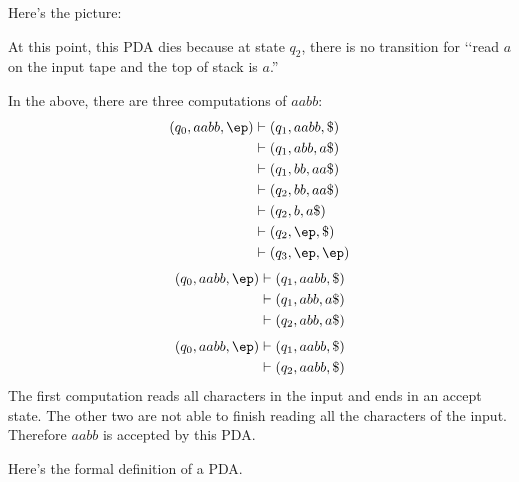 Here's the picture:



At this point, this PDA dies because at state $q_2$, there is no
transition for \lq\lq read $a$ on the input tape and the top of stack is $a$.''

In the above, there are three computations of $aabb$:
\begin{align*}
  (q_0, aabb, \ep)
  &\vdash (q_1, aabb, \$) \\
  &\vdash (q_1, abb, a\$) \\
  &\vdash (q_1, bb, aa\$) \\
  &\vdash (q_2, bb, aa\$) \\
  &\vdash (q_2, b, a\$) \\
  &\vdash (q_2, \ep, \$) \\
  &\vdash (q_3, \ep, \ep) 
\end{align*}
\begin{align*}
(q_0, aabb, \ep) 
&\vdash (q_1, aabb, \$) \\
&\vdash (q_1, abb, a\$) \\
&\vdash (q_2, abb, a\$) 
\end{align*}
\begin{align*}
(q_0, aabb, \ep) 
&\vdash (q_1, aabb, \$) \\
&\vdash (q_2, aabb, \$) 
\end{align*}
The first computation reads all characters in the input and ends in an
accept state.
The other two are not able to finish reading all the characters of the input.
Therefore $aabb$ is accepted by this PDA.

\newpage


\newpage


\newpage


\newpage


\newpage
Here's the formal definition of a PDA.


